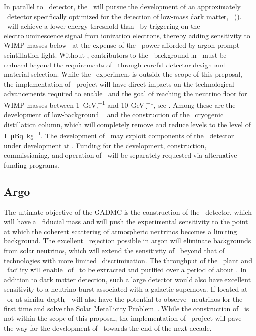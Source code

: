 In parallel to \DSks\ detector, the \GADMC\ will pursue the development of an approximately \DSlApproxMassScale\ detector specifically optimized for the detection of low-mass dark matter, \DSl\ (\DSls).  \DSls\ will achieve a lower energy threshold than \DSks\ by triggering on the electroluminescence signal from ionization electrons, thereby adding sensitivity to WIMP masses below \DSlLowMassThreshold\ at the expense of the \PSD\ power afforded by argon prompt scintillation light.  Without \PSD, contributors to the \ER\ background in \DSls\ must be reduced beyond the requirements of \DSks\ through careful detector design and material selection. While the \DSls\ experiment is outside the scope of this proposal, the implementation of \DSk\ project will have direct impacts on the technological advancements required to enable \DSls\ and the goal of reaching the neutrino floor for WIMP masses between \SI{1}{\GeV\per\c\squared} and \SI{10}{\GeV\per\c\squared}, see .  Among these are the development of low-background \DSkPdms~\cite{DIncecco:2018fx,DIncecco:2018hy} and the construction of the \Aria\ cryogenic distillation column, which will completely remove  and reduce  levels to the level of \SI{1}{\micro\becquerel\per\kg}.  The development of \DSls\ may exploit components of the \DSps\ detector under development at \CERN.  Funding for the development, construction, commissioning, and operation of \DSls\ will be separately requested via alternative funding programs.


\subsection{Argo}
\label{sec:Argo}

The ultimate objective of the GADMC is the construction of the \Argo\ detector, which will have a \GADMCFiducialMass\ fiducial mass and will push the experimental sensitivity to the point at which the coherent scattering of atmospheric neutrinos becomes a limiting background. The excellent \ER\ rejection possible in argon will eliminate backgrounds from solar neutrinos, which will extend the sensitivity of \Argo\ beyond that of technologies with more limited \ER\ discrimination. The throughput  of the \Urania\ plant and \Aria\ facility will enable \ArgoTotalMass\ of \UAr\ to be extracted and purified over a period of about \ArgoExtractionPeriod.  In addition to dark matter detection, such a large detector would also have excellent sensitivity to a neutrino burst associated with a galactic supernova.  If located at \SNOLAB\ or at similar depth, \Argo\ will also have the potential to observe \CNO\ neutrinos for the first time and solve the Solar Metallicity Problem~\cite{Franco:2016ex}.  While the construction of \Argo\ is not within the scope of this proposal, the implementation of  \DSk\ project will pave the way for the development of \Argo\ towards the end of the next decade. 

